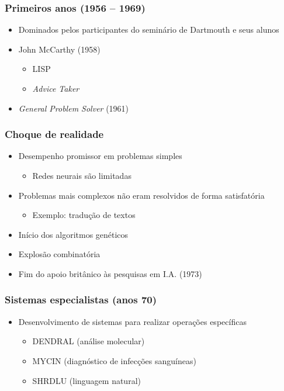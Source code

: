\documentclass[aspectratio=169]{beamer}
\begin{document}
	\begin{frame}
		\frametitle{Primeiros anos (1956 – 1969)}
		\begin{itemize}
			\item Dominados pelos participantes do seminário de Dartmouth e seus alunos
			\item John McCarthy (1958)
			\begin{itemize}
				\item LISP
				\item \textit{Advice Taker}
			\end{itemize}
			\item \textit{General Problem Solver} (1961)

		\end{itemize}
	\end{frame}

	\begin{frame}
		\frametitle{Choque de realidade}
		\begin{itemize}
			\item Desempenho promissor em problemas simples
			\begin{itemize}
				\item Redes neurais são limitadas
			\end{itemize}

			\item Problemas mais complexos não eram resolvidos de forma satisfatória
			\begin{itemize}
				\item Exemplo: tradução de textos
			\end{itemize}

			\item Início dos algoritmos genéticos
			
			\item Explosão combinatória
			
			\item Fim do apoio britânico às pesquisas em I.A. (1973)
		\end{itemize}
	\end{frame}

	\begin{frame}
		\frametitle{Sistemas especialistas (anos 70)}
		\begin{itemize}
			\item Desenvolvimento de sistemas para realizar operações específicas
			\begin{itemize}
				\item DENDRAL (análise molecular)
				\item MYCIN (diagnóstico de infecções sanguíneas)
				\item SHRDLU (linguagem natural)			
			\end{itemize}
		\end{itemize}
	\end{frame}
\end{document}
